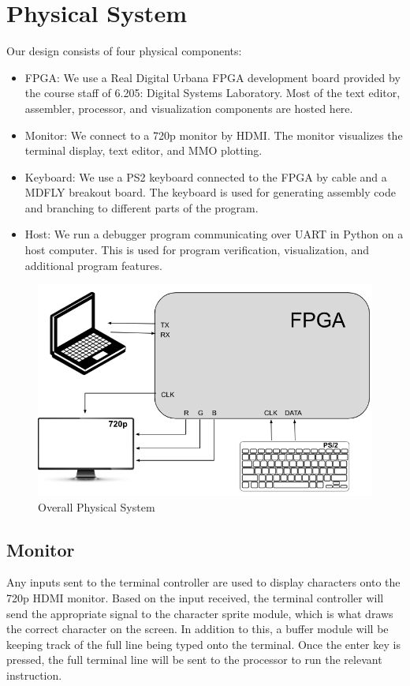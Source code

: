 \documentclass[conference]{IEEEtran}
\begin{document}
\section{Physical System}
Our design consists of four physical components:
\begin{itemize}
    \item FPGA: We use a Real Digital Urbana FPGA development board provided by the course staff of 6.205: Digital Systems Laboratory. Most of the text editor, assembler, processor, and visualization components are hosted here.
    \item Monitor: We connect to a 720p monitor by HDMI. The monitor visualizes the terminal display, text editor, and MMO plotting.
    \item Keyboard: We use a PS2 keyboard connected to the FPGA by cable and a MDFLY breakout board. The keyboard is used for generating assembly code and branching to different parts of the program.
    \item Host: We run a debugger program communicating over UART in Python on a host computer. This is used for program verification, visualization, and additional program features.
\end{itemize}


\begin{figure}
    \centering
    \includegraphics[width=1\linewidth]{physical_system.png}
    \caption{Overall Physical System}
    \label{fig:enter-label}
\end{figure}



\subsection{Monitor}
Any inputs sent to the terminal controller are used to display characters onto the 720p HDMI monitor. Based on the input received, the terminal controller will send the appropriate signal to the character sprite module, which is what draws the correct character on the screen. In addition to this, a buffer module will be keeping track of the full line being typed onto the terminal. Once the enter key is pressed, the full terminal line will be sent to the processor to run the relevant instruction.
\end{document}
